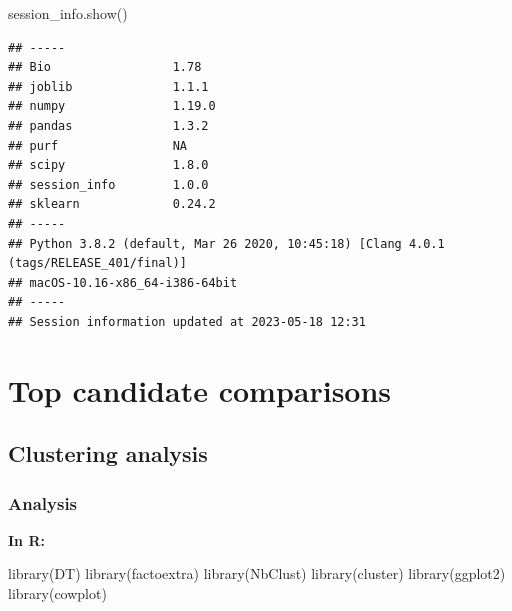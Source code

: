 \documentclass[
  11pt,
  oneside]{book}
\newenvironment{Shaded}{\begin{snugshade}}{\end{snugshade}}
\newcommand{\FunctionTok}[1]{\textcolor[rgb]{0.00,0.00,0.00}{#1}}
\newcommand{\NormalTok}[1]{#1}
\begin{document}
\begin{Shaded}
\begin{Highlighting}[]
\NormalTok{session\_info.show()}
\end{Highlighting}
\end{Shaded}

\begin{verbatim}
## -----
## Bio                 1.78
## joblib              1.1.1
## numpy               1.19.0
## pandas              1.3.2
## purf                NA
## scipy               1.8.0
## session_info        1.0.0
## sklearn             0.24.2
## -----
## Python 3.8.2 (default, Mar 26 2020, 10:45:18) [Clang 4.0.1 (tags/RELEASE_401/final)]
## macOS-10.16-x86_64-i386-64bit
## -----
## Session information updated at 2023-05-18 12:31
\end{verbatim}

\hypertarget{06_top_candidate_comparisons}{%
\chapter{Top candidate comparisons}\label{06_top_candidate_comparisons}}

\hypertarget{clustering-analysis}{%
\section{Clustering analysis}\label{clustering-analysis}}

\hypertarget{analysis-8}{%
\subsection{Analysis}\label{analysis-8}}

\textbf{In R: }

\begin{Shaded}
\begin{Highlighting}[]
\FunctionTok{library}\NormalTok{(DT)}
\FunctionTok{library}\NormalTok{(factoextra)}
\FunctionTok{library}\NormalTok{(NbClust)}
\FunctionTok{library}\NormalTok{(cluster)}
\FunctionTok{library}\NormalTok{(ggplot2)}
\FunctionTok{library}\NormalTok{(cowplot)}
\end{Highlighting}
\end{Shaded}
\end{document}
